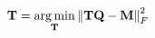\documentclass[preview]{standalone}
\begin{document}
\begin{align*}
\special{dvisvgm:raw <g id='unique000'>}\mathbf T=\underset{\mathbf T}{\operatorname*{arg\,min}}\left\|\mathbf T\mathbf Q-\mathbf M\right\|_F^2\special{dvisvgm:raw </g>}
\end{align*}
\end{document}
